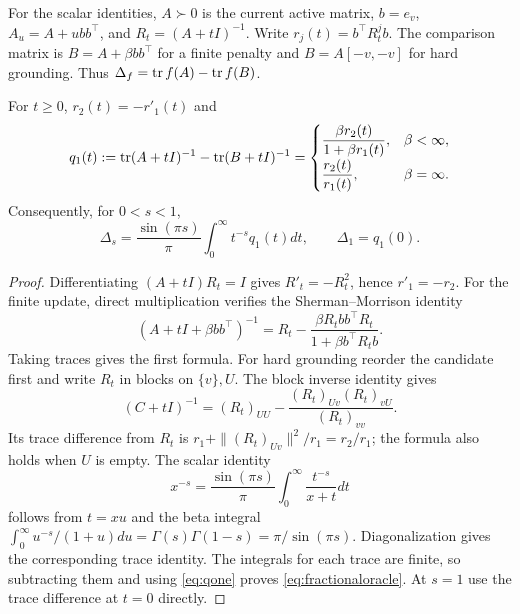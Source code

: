 For the scalar identities, $A\succ0$ is the current active matrix,
$b=e_v$, $A_u=A+ubb^\top$, and $R_t=(A+tI)^{-1}$.
Write $r_j(t)=b^\top R_t^j b$. The comparison matrix is
$B=A+\beta bb^\top$ for a finite penalty and $B=A[-v,-v]$ for
hard grounding. Thus $\Delta_f=\operatorname{tr} f(A)-\operatorname{tr} f(B)$.
\begin{lemma}\label{lem:resolvent}
For $t\geq0$, $r_2(t)=-r'_1(t)$ and
\begin{equation}\label{eq:qone}
 q_1(t):=\operatorname{tr}(A+tI)^{-1}-\operatorname{tr}(B+tI)^{-1}
 =\begin{cases}
 \displaystyle\frac{\beta r_2(t)}{1+\beta r_1(t)},&\beta<\infty,\\[6pt]
 \displaystyle\frac{r_2(t)}{r_1(t)},&\beta=\infty.
 \end{cases}
\end{equation}
Consequently, for $0<s<1$,
\begin{equation}\label{eq:fractionaloracle}
 \Delta_s=\frac{\sin(\pi s)}{\pi}
              \int_0^\infty t^{-s}q_1(t)dt,
 \qquad \Delta_1=q_1(0).
\end{equation}
\end{lemma}
\begin{proof}
Differentiating $(A+tI)R_t=I$ gives $R'_t=-R_t^2$, hence
$r'_1=-r_2$. For the finite update, direct multiplication verifies
the Sherman--Morrison identity
\[
 (A+tI+\beta bb^\top)^{-1}
 =R_t-\frac{\beta R_tbb^\top R_t}{1+\beta b^\top R_tb}.
\]
Taking traces gives the first formula. For hard grounding reorder
the candidate first and write $R_t$ in blocks on $\{v\},U$. The
block inverse identity gives
\[
 (C+tI)^{-1}=(R_t)_{UU}
       -\frac{(R_t)_{Uv}(R_t)_{vU}}{(R_t)_{vv}}.
\]
Its trace difference from $R_t$ is
$r_1+\|(R_t)_{Uv}\|^2/r_1=r_2/r_1$; the formula also holds when
$U$ is empty. The scalar identity
\[
 x^{-s}=\frac{\sin(\pi s)}{\pi}
           \int_0^\infty\frac{t^{-s}}{x+t}dt
\]
follows from $t=xu$ and the beta integral
$\int_0^\infty u^{-s}/(1+u)du=\Gamma(s)\Gamma(1-s)=\pi/\sin(\pi s)$.
Diagonalization gives the corresponding trace identity. The integrals
for each trace are finite, so subtracting them and using
\eqref{eq:qone} proves \eqref{eq:fractionaloracle}. At $s=1$ use
the trace difference at $t=0$ directly.
\end{proof}


